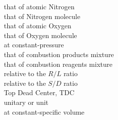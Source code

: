 \begin{tabbing}
            \> that of atomic Nitrogen                                                                                                                  \\
           \> that of Nitrogen molecule                                                                                                                \\
            \> that of atomic Oxygen                                                                                                                    \\
           \> that of Oxygen molecule                                                                                                                  \\
                                      \> at constant-pressure                                                                                                                     \\
             \> that of combustion products mixture                                                                                                      \\
             \> that of combustion reagents mixture                                                                                                      \\
                                   \> relative to the $R/L$ ratio                                                                                                              \\
                                   \> relative to the $S/D$ ratio                                                                                                              \\
    \tcs{{}_{\tdc}}                             \> Top Dead Center, TDC                                                                                                                     \\
                                      \> unitary or unit                                                                                                                          \\
                                      \> at constant-specific volume                                                                                                              \\
\end{tabbing}
                                                                                                                      
